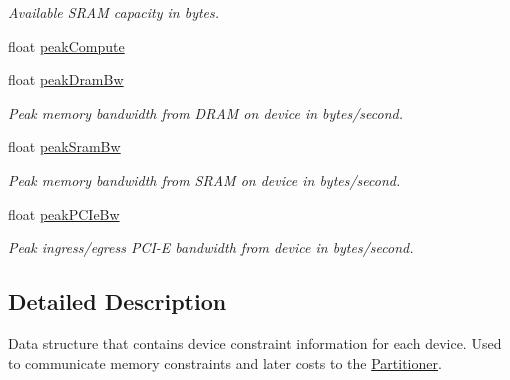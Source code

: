 \begin{DoxyCompactItemize}
\begin{DoxyCompactList}\small\item\em Available S\+R\+AM capacity in bytes. \end{DoxyCompactList}\item 
float \hyperlink{structglow_1_1runtime_1_1_device_info_afda59a78f7d60ed3cab125b778e270cb}{peak\+Compute}
\item 
\mbox{\label{structglow_1_1runtime_1_1_device_info_a7beab56e3141c4d1c9026b6f402c284d}} 
float \hyperlink{structglow_1_1runtime_1_1_device_info_a7beab56e3141c4d1c9026b6f402c284d}{peak\+Dram\+Bw}
\begin{DoxyCompactList}\small\item\em Peak memory bandwidth from D\+R\+AM on device in bytes/second. \end{DoxyCompactList}\item 
\mbox{\label{structglow_1_1runtime_1_1_device_info_a23e3329fd7a86d3e3b10a92028a123bc}} 
float \hyperlink{structglow_1_1runtime_1_1_device_info_a23e3329fd7a86d3e3b10a92028a123bc}{peak\+Sram\+Bw}
\begin{DoxyCompactList}\small\item\em Peak memory bandwidth from S\+R\+AM on device in bytes/second. \end{DoxyCompactList}\item 
\mbox{\label{structglow_1_1runtime_1_1_device_info_a5e6b88abed0ee1a978d92ab6a1769f5d}} 
float \hyperlink{structglow_1_1runtime_1_1_device_info_a5e6b88abed0ee1a978d92ab6a1769f5d}{peak\+P\+C\+Ie\+Bw}
\begin{DoxyCompactList}\small\item\em Peak ingress/egress P\+C\+I-\/E bandwidth from device in bytes/second. \end{DoxyCompactList}\end{DoxyCompactItemize}


\subsection{Detailed Description}
Data structure that contains device constraint information for each device. Used to communicate memory constraints and later costs to the \hyperlink{classglow_1_1_partitioner}{Partitioner}. 

